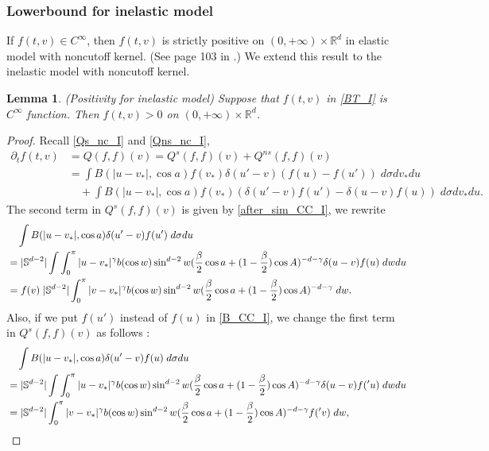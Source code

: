 \documentclass[reqno,10pt]{amsart}
\newtheorem{lemma}[theorem]{Lemma}
\numberwithin{equation}{section}
\begin{document}
\subsubsection{Lowerbound for inelastic model}
If $f(t,v) \in C^{\infty}$, then $f(t,v)$ is strictly positive on $(0,+\infty)\times \mathbb{R}^{d}$ in elastic model with noncutoff kernel. (See page 103 in \cite{V2002}.)
We extend this result to the inelastic model with noncutoff kernel. 
\begin{lemma} (Positivity for inelastic model) \label{pos_nc_I}
Suppose that $f(t,v)$ in \eqref{BT_I} is $C^{\infty}$ function. Then $f(t,v)>0$ on $(0,+\infty)\times \mathbb{R}^{d}$. 
\end{lemma}
\begin{proof}
Recall \eqref{Qs_nc_I} and \eqref{Qns_nc_I}, 
\begin{align*}
\partial_t f(t,v) &=
Q(f,f)(v) = Q^{s}(f,f)(v) + Q^{ns}(f,f)(v)  \\
     &= \int B(|u-v_*|, \cos a)f(v_*)\delta(u'-v)(f(u)-f(u'))\; d\sigma dv_*du \\
     &\quad + \int B(|u-v_*|, \cos a)f(v_*)(\delta(u'-v)f(u')-\delta(u-v)f(u))\; d\sigma dv_* du.
\end{align*}
The second term in $Q^{s}(f,f)(v)$ is given by \eqref{after_sim_CC_I}, we rewrite
\begin{align}
	&\quad \int B(|u-v_*|, \cos a)\delta(u'-v)f(u')\; d\sigma du \notag \\
	&=|\mathbb{S}^{d-2}|\int \int_0^\pi |u-v_*|^{\gamma}b(\cos w)\sin^{d-2}w (\frac{\beta}{2}\cos a + (1-\frac{\beta}{2})\cos A)^{-d-\gamma}\delta(u-v)f(u) \; dwdu \notag \\
	&=f(v)\;|\mathbb{S}^{d-2}| \int_0^\pi |v-v_*|^{\gamma}b(\cos w)\sin^{d-2}w (\frac{\beta}{2}\cos a + (1-\frac{\beta}{2})\cos A)^{-d-\gamma}\; dw.  \label{second_Qs_pos_I}
\end{align}
Also, if we put $f(u')$ instead of $f(u)$ in \eqref{B_CC_I}, we change the first term in $Q^s(f,f)(v)$ as follows : 
\begin{align}
    &\quad \int B(|u-v_*|, \cos a)\delta(u'-v)f(u)\; d\sigma du \notag \\
     &=|\mathbb{S}^{d-2}|\int \int_0^\pi |u-v_*|^{\gamma}b(\cos w)\sin^{d-2}w (\frac{\beta}{2}\cos a + (1-\frac{\beta}{2})\cos A)^{-d-\gamma}\delta(u-v)f('u) \; dwdu \notag\\
   &=|\mathbb{S}^{d-2}|\int_0^\pi |v-v_*|^{\gamma}b(\cos w)\sin^{d-2}w (\frac{\beta}{2}\cos a + (1-\frac{\beta}{2})\cos A)^{-d-\gamma}f('v) \; dw, \label{first_Qs_pos_I}

\end{align}
\end{proof}
\end{document}
